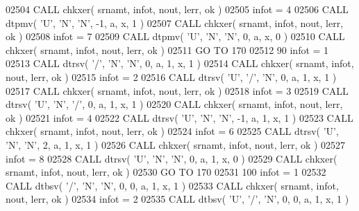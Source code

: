 \begin{DoxyCode}
02504       \textcolor{keyword}{CALL }chkxer( srnamt, infot, nout, lerr, ok )
02505       infot = 4
02506       \textcolor{keyword}{CALL }dtpmv( \textcolor{stringliteral}{'U'}, \textcolor{stringliteral}{'N'}, \textcolor{stringliteral}{'N'}, -1, a, x, 1 )
02507       \textcolor{keyword}{CALL }chkxer( srnamt, infot, nout, lerr, ok )
02508       infot = 7
02509       \textcolor{keyword}{CALL }dtpmv( \textcolor{stringliteral}{'U'}, \textcolor{stringliteral}{'N'}, \textcolor{stringliteral}{'N'}, 0, a, x, 0 )
02510       \textcolor{keyword}{CALL }chkxer( srnamt, infot, nout, lerr, ok )
02511       \textcolor{keywordflow}{GO TO} 170
02512    90 infot = 1
02513       \textcolor{keyword}{CALL }dtrsv( \textcolor{stringliteral}{'/'}, \textcolor{stringliteral}{'N'}, \textcolor{stringliteral}{'N'}, 0, a, 1, x, 1 )
02514       \textcolor{keyword}{CALL }chkxer( srnamt, infot, nout, lerr, ok )
02515       infot = 2
02516       \textcolor{keyword}{CALL }dtrsv( \textcolor{stringliteral}{'U'}, \textcolor{stringliteral}{'/'}, \textcolor{stringliteral}{'N'}, 0, a, 1, x, 1 )
02517       \textcolor{keyword}{CALL }chkxer( srnamt, infot, nout, lerr, ok )
02518       infot = 3
02519       \textcolor{keyword}{CALL }dtrsv( \textcolor{stringliteral}{'U'}, \textcolor{stringliteral}{'N'}, \textcolor{stringliteral}{'/'}, 0, a, 1, x, 1 )
02520       \textcolor{keyword}{CALL }chkxer( srnamt, infot, nout, lerr, ok )
02521       infot = 4
02522       \textcolor{keyword}{CALL }dtrsv( \textcolor{stringliteral}{'U'}, \textcolor{stringliteral}{'N'}, \textcolor{stringliteral}{'N'}, -1, a, 1, x, 1 )
02523       \textcolor{keyword}{CALL }chkxer( srnamt, infot, nout, lerr, ok )
02524       infot = 6
02525       \textcolor{keyword}{CALL }dtrsv( \textcolor{stringliteral}{'U'}, \textcolor{stringliteral}{'N'}, \textcolor{stringliteral}{'N'}, 2, a, 1, x, 1 )
02526       \textcolor{keyword}{CALL }chkxer( srnamt, infot, nout, lerr, ok )
02527       infot = 8
02528       \textcolor{keyword}{CALL }dtrsv( \textcolor{stringliteral}{'U'}, \textcolor{stringliteral}{'N'}, \textcolor{stringliteral}{'N'}, 0, a, 1, x, 0 )
02529       \textcolor{keyword}{CALL }chkxer( srnamt, infot, nout, lerr, ok )
02530       \textcolor{keywordflow}{GO TO} 170
02531   100 infot = 1
02532       \textcolor{keyword}{CALL }dtbsv( \textcolor{stringliteral}{'/'}, \textcolor{stringliteral}{'N'}, \textcolor{stringliteral}{'N'}, 0, 0, a, 1, x, 1 )
02533       \textcolor{keyword}{CALL }chkxer( srnamt, infot, nout, lerr, ok )
02534       infot = 2
02535       \textcolor{keyword}{CALL }dtbsv( \textcolor{stringliteral}{'U'}, \textcolor{stringliteral}{'/'}, \textcolor{stringliteral}{'N'}, 0, 0, a, 1, x, 1 )

\end{DoxyCode}
